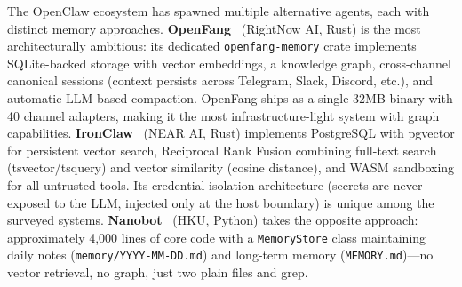 The OpenClaw ecosystem has spawned multiple alternative agents, each with
distinct memory approaches.
\textbf{OpenFang}~\cite{openfang2026} (RightNow AI, Rust) is the most
architecturally ambitious: its dedicated \texttt{openfang-memory} crate
implements SQLite-backed storage with vector embeddings, a knowledge
graph, cross-channel canonical sessions (context persists across
Telegram, Slack, Discord, etc.), and automatic LLM-based compaction.
OpenFang ships as a single 32MB binary with 40 channel adapters, making
it the most infrastructure-light system with graph capabilities.
\textbf{IronClaw}~\cite{ironclaw2026} (NEAR AI, Rust) implements
PostgreSQL with pgvector for persistent vector search, Reciprocal Rank
Fusion combining full-text search (tsvector/tsquery) and vector
similarity (cosine distance), and WASM sandboxing for all untrusted
tools.  Its credential isolation architecture (secrets are never exposed
to the LLM, injected only at the host boundary) is unique among the
surveyed systems.
\textbf{Nanobot}~\cite{nanobot2026} (HKU, Python) takes the opposite
approach: approximately 4,000 lines of core code with a
\texttt{MemoryStore} class maintaining daily notes
(\texttt{memory/YYYY-MM-DD.md}) and long-term memory
(\texttt{MEMORY.md})---no vector retrieval, no graph, just two plain
files and grep.

